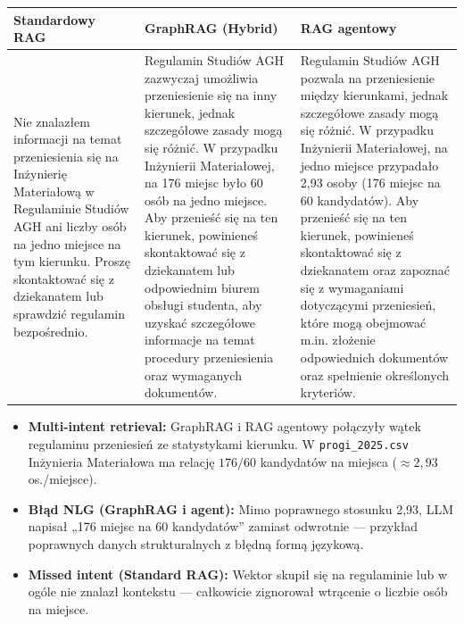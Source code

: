 \noindent
\begin{tabularx}{\textwidth}{@{} >{\raggedright\arraybackslash}X >{\raggedright\arraybackslash}X >{\raggedright\arraybackslash}X @{}}
    \toprule
    \textbf{Standardowy RAG} & \textbf{GraphRAG (Hybrid)} & \textbf{RAG agentowy} \\
    \midrule
    \footnotesize Nie znalazłem informacji na temat przeniesienia się na Inżynierię Materiałową w Regulaminie Studiów AGH ani liczby osób na jedno miejsce na tym kierunku. Proszę skontaktować się z dziekanatem lub sprawdzić regulamin bezpośrednio. & \footnotesize Regulamin Studiów AGH zazwyczaj umożliwia przeniesienie się na inny kierunek, jednak szczegółowe zasady mogą się różnić. W przypadku Inżynierii Materiałowej, na 176 miejsc było 60 osób na jedno miejsce. Aby przenieść się na ten kierunek, powinieneś skontaktować się z dziekanatem lub odpowiednim biurem obsługi studenta, aby uzyskać szczegółowe informacje na temat procedury przeniesienia oraz wymaganych dokumentów. & \footnotesize Regulamin Studiów AGH pozwala na przeniesienie między kierunkami, jednak szczegółowe zasady mogą się różnić. W przypadku Inżynierii Materiałowej, na jedno miejsce przypadało 2,93 osoby (176 miejsc na 60 kandydatów). Aby przenieść się na ten kierunek, powinieneś skontaktować się z dziekanatem oraz zapoznać się z wymaganiami dotyczącymi przeniesień, które mogą obejmować m.in. złożenie odpowiednich dokumentów oraz spełnienie określonych kryteriów. \\
    \bottomrule
\end{tabularx}

\begin{tcolorbox}[colback=green!5!white,colframe=green!50!black,title=Wnioski i obserwacje]
    \begin{itemize}
        \item \textbf{Multi-intent retrieval:} GraphRAG i RAG agentowy połączyły wątek regulaminu przeniesień ze statystykami kierunku. W \texttt{progi\_2025.csv} Inżynieria Materiałowa ma relację $176/60$ kandydatów na miejsca ($\approx 2{,}93$ os./miejsce).
        \item \textbf{Błąd NLG (GraphRAG i agent):} Mimo poprawnego stosunku 2,93, LLM napisał „176 miejsc na 60 kandydatów'' zamiast odwrotnie --- przykład poprawnych danych strukturalnych z błędną formą językową.
        \item \textbf{Missed intent (Standard RAG):} Wektor skupił się na regulaminie lub w ogóle nie znalazł kontekstu --- całkowicie zignorował wtrącenie o liczbie osób na miejsce.
    \end{itemize}
\end{tcolorbox}
\vspace{1em}

